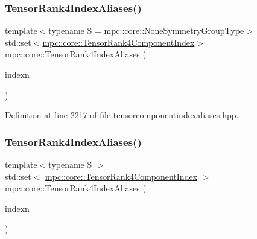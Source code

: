 \subsubsection{\texorpdfstring{Tensor\+Rank4\+Index\+Aliases()}{TensorRank4IndexAliases()}\hspace{0.1cm}{\footnotesize\ttfamily [1/2]}}
{\footnotesize\ttfamily template$<$typename S  = mpc\+::core\+::\+None\+Symmetry\+Group\+Type$>$ \\
std\+::set$<$\mbox{\hyperlink{namespacempc_1_1core_a54c081f41b2475abd10182bf023805d2}{mpc\+::core\+::\+Tensor\+Rank4\+Component\+Index}}$>$ mpc\+::core\+::\+Tensor\+Rank4\+Index\+Aliases (\begin{DoxyParamCaption}\item[{const \mbox{\hyperlink{classmpc_1_1core_1_1_tensor_rank_n_component_index}{mpc\+::core\+::\+Tensor\+Rank\+N\+Component\+Index}}$<$ 4 $>$ \&}]{indexn }\end{DoxyParamCaption})\hspace{0.3cm}{\ttfamily [inline]}}



Definition at line 2217 of file tensorcomponentindexaliases.\+hpp.

\mbox{\label{namespacempc_1_1core_ae51c90cf3ec68d7a452bfcefc3405858}} 
\subsubsection{\texorpdfstring{Tensor\+Rank4\+Index\+Aliases()}{TensorRank4IndexAliases()}\hspace{0.1cm}{\footnotesize\ttfamily [2/2]}}
{\footnotesize\ttfamily template$<$typename S $>$ \\
std\+::set$<$ \mbox{\hyperlink{namespacempc_1_1core_a54c081f41b2475abd10182bf023805d2}{mpc\+::core\+::\+Tensor\+Rank4\+Component\+Index}} $>$ mpc\+::core\+::\+Tensor\+Rank4\+Index\+Aliases (\begin{DoxyParamCaption}\item[{const \mbox{\hyperlink{classmpc_1_1core_1_1_tensor_rank_n_component_index}{mpc\+::core\+::\+Tensor\+Rank\+N\+Component\+Index}}$<$ 2 $>$ \&}]{indexn }\end{DoxyParamCaption})\hspace{0.3cm}{\ttfamily [inline]}}



